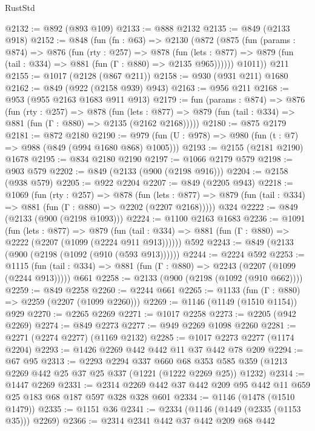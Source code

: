 \begin{lexlean}{RustStd}
\begin{coremodule}
@2132 := @892 (@893 @109)
@2133 := @888 @2132
@2135 := @849 (@2133 @918)
@2152 := @848
    (fun (fn : @63) =>
    @2130
      (@872
        (@875
          (fun (params : @874) =>
          @876
            (fun (rty : @257) =>
            @878
              (fun (lets : @877) =>
              @879 (fun (tail : @334) => @881 (fun (Γ : @880) => @2135 @965))))))
        @1011))
    @211
@2155 := @1017 (@2128 (@867 @211))
@2158 := @930 (@931 @211) @1680
@2162 := @849 (@922 (@2158 @939) @943)
@2163 := @956 @211
@2168 := @953 (@955 @2163 @1683 @911 @913)
@2179 := fun (params : @874) =>
  @876
    (fun (rty : @257) =>
    @878
      (fun (lets : @877) =>
      @879 (fun (tail : @334) => @881 (fun (Γ : @880) => @2135 (@2162 @2168)))))
@2180 := @875 @2179
@2181 := @872 @2180
@2190 := @979 (fun (U : @978) => @980 (fun (t : @7) => @988 (@849 (@994 @1680 @868) @1005)))
@2193 := @2155 (@2181 @2190) @1678
@2195 := @834 @2180 @2190
@2197 := @1066 @2179 @579
@2198 := @903 @579
@2202 := @849 (@2133 (@900 (@2198 @916)))
@2204 := @2158 (@938 @579)
@2205 := @922 @2204
@2207 := @849 (@2205 @943)
@2218 := @1069
    (fun (rty : @257) =>
    @878
      (fun (lets : @877) =>
      @879 (fun (tail : @334) => @881 (fun (Γ : @880) => @2202 (@2207 @2168)))))
    @324
@2222 := @849 (@2133 (@900 (@2198 @1093)))
@2224 := @1100 @2163 @1683
@2236 := @1091
    (fun (lets : @877) =>
    @879 (fun (tail : @334) => @881 (fun (Γ : @880) => @2222 (@2207 (@1099 (@2224 @911 @913))))))
    @592
@2243 := @849 (@2133 (@900 (@2198 (@1092 (@910 (@593 @913))))))
@2244 := @2224 @592
@2253 := @1115
    (fun (tail : @334) => @881 (fun (Γ : @880) => @2243 (@2207 (@1099 (@2244 @913)))))
    @661
@2258 := @2133 (@900 (@2198 (@1092 (@910 @662))))
@2259 := @849 @2258
@2260 := @2244 @661
@2265 := @1133 (fun (Γ : @880) => @2259 (@2207 (@1099 @2260)))
@2269 := @1146 (@1149 (@1510 @1154)) @929
@2270 := @2265 @2269
@2271 := @1017 @2258
@2273 := @2205 (@942 @2269)
@2274 := @849 @2273
@2277 := @949 @2269 @1098 @2260
@2281 := @2271 (@2274 @2277) (@1169 @2132)
@2285 := @1017 @2273 @2277 (@1174 @2204)
@2293 := @1426 @2269 @442 @442 @11 @37 @442 @78 @209
@2294 := @67 @95
@2313 := @2293
    @2294
    @337
    @660
    @68
    @353
    @585
    @359
    (@1213 @2269 @442 @25 @37 @25 @337 (@1221 (@1222 @2269 @25)) @1232)
@2314 := @1447 @2269
@2331 := @2314 @2269 @442 @37 @442 @209 @95 @442 @11 @659 @25 @183 @68 @187 @597 @328 @328 @601
@2334 := @1146 (@1478 (@1510 @1479))
@2335 := @1151 @36
@2341 := @2334 (@1146 (@1449 (@2335 (@1153 @35))) @2269)
@2366 := @2314
    @2341
    @442
    @37
    @442
    @209
    @68
    @442

\end{coremodule}
\end{lexlean}
